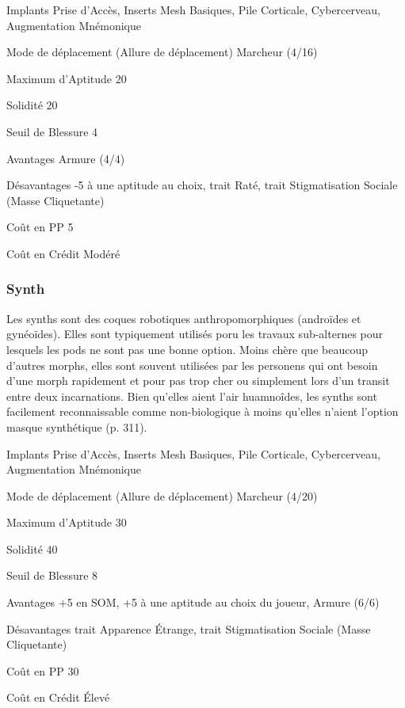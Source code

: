 \begin{description*} \item[Implants] Prise d'Accès, Inserts Mesh Basiques, Pile Corticale, Cybercerveau, Augmentation Mnémonique\item[Mode de déplacement](Allure de déplacement) Marcheur (4/16)\item[Maximum d'Aptitude] 20 \item[Solidité] 20 \item[Seuil de Blessure] 4 \item[Avantages] Armure (4/4)\item[Désavantages] -5 à une aptitude au choix, trait Raté, trait Stigmatisation Sociale (Masse Cliquetante) \item [Coût en PP] 5 \item[Coût en Crédit] Modéré \end{description*} 

\subsubsection{Synth} \label{sec:starting-synths} 

Les synths sont des coques robotiques anthropomorphiques (androïdes et gynéoïdes). Elles sont typiquement utilisés poru les travaux sub-alternes pour lesquels les pods ne sont pas une bonne option. Moins chère que beaucoup d'autres morphs, elles sont souvent utilisées par les personens qui ont besoin d'une morph rapidement et pour pas trop cher ou simplement lors d'un transit entre deux incarnations. Bien qu'elles aient l'air huamnoîdes, les synths sont facilement reconnaissable comme non-biologique à moins qu'elles n'aient l'option masque synthétique (p. 311). 

\begin{description*} \item[Implants] Prise d'Accès, Inserts Mesh Basiques, Pile Corticale, Cybercerveau, Augmentation Mnémonique\item[Mode de déplacement](Allure de déplacement) Marcheur (4/20)\item[Maximum d'Aptitude] 30 \item[Solidité] 40 \item[Seuil de Blessure] 8 \item[Avantages] +5 en SOM, +5 à une aptitude au choix du joueur, Armure (6/6)\item[Désavantages] trait Apparence Étrange, trait Stigmatisation Sociale (Masse Cliquetante) \item [Coût en PP] 30 \item[Coût en Crédit] Élevé \end{description*} 

